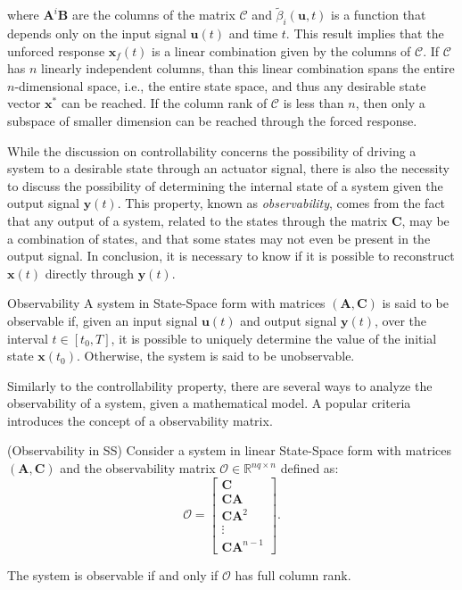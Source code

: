 \documentclass[a4paper,11pt]{book}
\numberwithin{figure}{chapter}
\numberwithin{equation}{chapter}
\numberwithin{table}{chapter}
\newtheorem{theorem}{Theorem}[chapter]
\theoremstyle{definition}
\newtheorem{definition}{Definition}[chapter]
\newcounter{boxed-theorem}
\newenvironment{boxed-theorem}[1]
{\begin{shaded} \begin{theorem}{#1}}
{\end{theorem} \end{shaded}}
\newcounter{boxed-definition}
\newenvironment{boxed-definition}[1]
{\begin{shaded} \begin{definition}{#1}}
{\end{definition} \end{shaded}}
\begin{document}
\noindent where $\bm{A}^i \bm{B}$ are the columns of the matrix $\bm{\mathcal{C}}$ and $\tilde{\beta}_i(\bm{u}, t)$ is a function that depends only on the input signal $\bm{u}(t)$ and time $t$. This result implies that the unforced response $\bm{x}_f(t)$ is a linear combination given by the columns of $\bm{\mathcal{C}}$. If $\bm{\mathcal{C}}$ has $n$ linearly independent columns, than this linear combination spans the entire $n$-dimensional space, i.e., the entire state space, and thus any desirable state vector $\bm{x}^*$ can be reached. If the column rank of $\bm{\mathcal{C}}$ is less than $n$, then only a subspace of smaller dimension can be reached through the forced response.

While the discussion on controllability concerns the possibility of driving a system to a desirable state through an actuator signal, there is also the necessity to discuss the possibility of determining the internal state of a system given the output signal $\bm{y}(t)$. This property, known as \textit{observability}, comes from the fact that any output of a system, related to the states through the matrix $\bm{C}$, may be a combination of states, and that some states may not even be present in the output signal. In conclusion, it is necessary to know if it is possible to reconstruct $\bm{x}(t)$ directly through $\bm{y}(t)$. 

\begin{boxed-definition}{Observability}
    A system in State-Space form with matrices $(\bm{A}, \bm{C})$ is said to be observable if, given an input signal $\bm{u}(t)$ and output signal $\bm{y}(t)$, over the interval $t \in [t_0, T]$, it is possible to uniquely determine the value of the initial state $\bm{x}(t_0)$. Otherwise, the system is said to be unobservable.
\end{boxed-definition}

Similarly to the controllability property, there are several ways to analyze the observability of a system, given a mathematical model. A popular criteria introduces the concept of a observability matrix.

\begin{boxed-theorem}{(Observability in SS)}
    Consider a system in linear State-Space form with matrices $(\bm{A}, \bm{C})$ and the observability matrix $\bm{\mathcal{O}} \in \mathbb{R}^{nq \times n}$ defined as:
    \begin{equation}
        \bm{\mathcal{O}} = \begin{bmatrix} \bm{C} \\ \bm{C} \bm{A} \\ \bm{C} \bm{A}^2 \\ \vdots \\ \bm{C} \bm{A}^{n-1} \end{bmatrix}
    .\end{equation}
    
    The system is observable if and only if $\bm{\mathcal{O}}$ has full column rank.
\end{boxed-theorem}   
\end{document}
